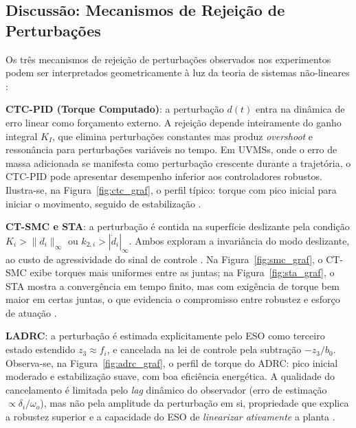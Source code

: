 \subsection{Discussão: Mecanismos de Rejeição de Perturbações}

Os três mecanismos de rejeição de perturbações observados nos experimentos podem ser interpretados geometricamente à luz da teoria de sistemas não-lineares \cite{khalil2002nonlinear, isidori1985nonlinear}:

\textbf{CTC-PID (Torque Computado)}: a perturbação $d(t)$ entra na dinâmica de erro linear como forçamento externo. A rejeição depende inteiramente do ganho integral $K_I$, que elimina perturbações constantes mas produz \textit{overshoot} e ressonância para perturbações variáveis no tempo. Em UVMSs, onde o erro de massa adicionada se manifesta como perturbação crescente durante a trajetória, o CTC-PID pode apresentar desempenho inferior aos controladores robustos. Ilustra-se, na Figura~\ref{fig:ctc_graf}, o perfil típico: torque com pico inicial para iniciar o movimento, seguido de estabilização \cite{ogata2010modern, astrom1995theory, fossen2011handbook}.

\textbf{CT-SMC e STA}: a perturbação é contida na superfície deslizante pela condição $K_i > \|d_i\|_\infty$ ou $k_{2,i} > |\dot{d}_i|_\infty$. Ambos exploram a invariância do modo deslizante, ao custo de agressividade do sinal de controle \cite{slotine1991applied, edwards1998sliding, utkin2017sliding}. Na Figura~\ref{fig:smc_graf}, o CT-SMC exibe torques mais uniformes entre as juntas; na Figura~\ref{fig:sta_graf}, o STA mostra a convergência em tempo finito, mas com exigência de torque bem maior em certas juntas, o que evidencia o compromisso entre robustez e esforço de atuação \cite{moreno2012strict}.

\textbf{LADRC}: a perturbação é estimada explicitamente pelo ESO como terceiro estado estendido $z_3 \approx f_i$, e cancelada na lei de controle pela subtração $-z_3/b_0$. Observa-se, na Figura~\ref{fig:adrc_graf}, o perfil de torque do ADRC: pico inicial moderado e estabilização suave, com boa eficiência energética. A qualidade do cancelamento é limitada pelo \textit{lag} dinâmico do observador (erro de estimação $\propto \delta_i/\omega_o$), mas não pela amplitude da perturbação em si, propriedade que explica a robustez superior e a capacidade do ESO de \textit{linearizar ativamente} a planta \cite{gao2003scaling, zheng2010practical, huang2014active, han2009pid, han1995class}.

